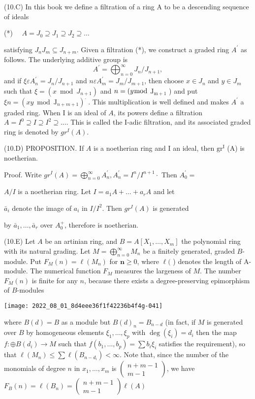 (10.C) In this book we define a filtration of a ring A to be a descending sequence of ideals

(*) $\quad A=J_{0} \supseteq J_{1} \supseteq J_{2} \supseteq \ldots$

satisfying $J_{n} J_{m} \subseteq J_{n+m}$. Given a filtration (*), we construct a graded ring $A^{\prime}$ as follows. The underlying additive group is
$$
A^{\prime}=\bigoplus_{n=0}^{\infty} J_{n} / J_{n+1},
$$
and if $\xi \varepsilon A_{n}^{\prime}=J_{n} / J_{n+1}$ and $n \varepsilon A_{m}^{\prime}=J_{m} / J_{m+1}$, then choose $x \in J_{n}$ and $y \in J_{m}$ such that $\xi=\left(x \bmod J_{n+1}\right)$ and $n=(y \bmod$ $\mathrm{J}_{\mathrm{m}+1}$ ) and put $\xi n=\left(x y \bmod \mathrm{J}_{n+m+1}\right)^{\text {. }}$. This multiplication is well defined and makes $A^{\prime}$ a graded ring. When I is an ideal of $A$, its powers define a filtration $A=I^{0} \supseteq I \supseteq I^{2} \supseteq \ldots$. This is called the I-adic filtration, and its associated graded ring is denoted by $g r^{I}(A)$.

(10.D) PROPOSITION. If $A$ is a noetherian ring and I an ideal, then $\mathrm{gr}^{\mathrm{I}}$ (A) is noetherian.

Proof. Write $g r^{I}(A)=\bigoplus_{n=0}^{\infty} A_{n}^{\prime}, A_{n}^{\prime}=I^{n} / I^{n+1} \cdot$ Then $A_{0}^{\prime}=$

$A / I$ is a noetherian ring. Let $I=a_{1} A+\ldots+a_{r} A$ and let

$\bar{a}_{i}$ denote the image of $a_{i}$ in $I / I^{2}$. Then $g r^{I}(A)$ is generated

by $\bar{a}_{1}, \ldots, \bar{a}_{r}$ over $A_{0}^{+}$, therefore is noetherian.

(10.E) Let $A$ be an artinian ring, and $B=A\left[X_{1}, \ldots, X_{m}\right]$ the polynomial ring with its natural grading. Let $M=\bigoplus_{n=0}^{\infty} M_{n}$ be a finitely generated, graded $B$-module. Put $F_{M}(n)=\ell\left(M_{n}\right)$ for $\mathbf{n} \geqslant 0$, where $\ell($ ) denotes the length of A-module. The numerical function $F_{M}$ measures the largeness of $M$. The number $F_{M}(n)$ is finite for any $n$, because there exists a degree-preserving epimorphism of $B$-modules

\texttt{[image: 2022\_08\_01\_8d4eee36f1f42236b4f4g-041]}

where $B(d)=B$ as a module but $B(d)_{n}=B_{n-d}$ (in fact, if $M$ is generated over $B$ by homogeneous elements $\xi_{1}, \ldots, \xi_{p}$ with $\operatorname{deg}\left(\xi_{i}\right)=d_{i}$ then the map $f: \oplus B\left(d_{i}\right) \rightarrow M$ such that $f\left(b_{1}, \ldots, b_{p}\right)=\sum b_{i} \xi_{i}$ satisfies the requirement), so that $\ell\left(M_{n}\right) \leqslant \sum \ell\left(B_{n-d_{i}}\right)<\infty$. Note that, since the number of the monomials of degree $n$ in $x_{1}, \ldots, x_{m}$ is $\left(\begin{array}{c}n+m-1 \\ m-1\end{array}\right)$, we have $F_{B}(n)=\ell\left(B_{n}\right)=\left(\begin{array}{c}n+m-1 \\ m-1\end{array}\right) \ell(A)$

